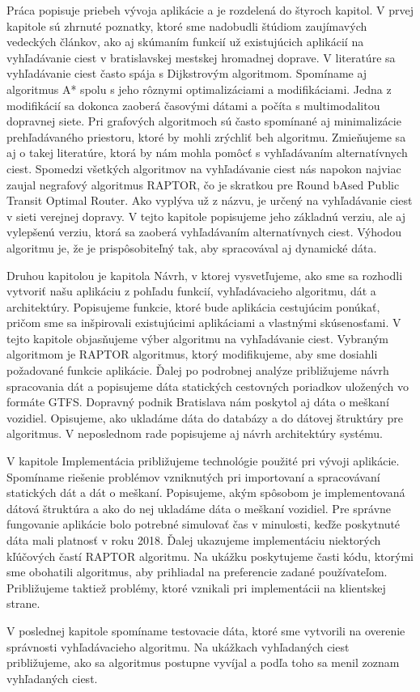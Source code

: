 Práca popisuje priebeh vývoja aplikácie a je rozdelená do štyroch kapitol. 
V prvej kapitole sú zhrnuté poznatky, ktoré sme nadobudli štúdiom zaujímavých vedeckých článkov, 
ako aj skúmaním funkcií už existujúcich aplikácií na vyhľadávanie ciest v bratislavskej mestskej hromadnej doprave. V literatúre sa vyhľadávanie ciest často spája s Dijkstrovým algoritmom.  
Spomíname aj algoritmus A* spolu s jeho rôznymi optimalizáciami a modifikáciami. Jedna z modifikácií sa dokonca zaoberá časovými dátami a počíta s multimodalitou dopravnej siete. Pri grafových algoritmoch sú často spomínané aj minimalizácie prehľadávaného priestoru, ktoré by mohli zrýchliť beh algoritmu. Zmieňujeme sa aj o takej literatúre, ktorá by nám mohla pomôcť s vyhľadávaním alternatívnych ciest. Spomedzi všetkých algoritmov na vyhľadávanie ciest nás napokon najviac zaujal negrafový algoritmus RAPTOR, čo je skratkou pre Round bAsed Public Transit Optimal Router. Ako vyplýva už z názvu, je určený na vyhľadávanie ciest v sieti verejnej dopravy. V tejto kapitole popisujeme jeho základnú verziu, ale aj vylepšenú verziu, ktorá sa zaoberá vyhľadávaním alternatívnych ciest. Výhodou algoritmu je, že je prispôsobiteľný tak, aby spracovával aj dynamické dáta. 

Druhou kapitolou je kapitola Návrh, v ktorej vysvetľujeme, ako sme sa rozhodli vytvoriť našu aplikáciu z pohľadu funkcií, vyhľadávacieho algoritmu, dát a architektúry. Popisujeme funkcie, ktoré bude aplikácia cestujúcim ponúkať, pričom sme sa inšpirovali existujúcimi aplikáciami a vlastnými skúsenosťami. V tejto kapitole objasňujeme výber algoritmu na vyhľadávanie ciest. Vybraným algoritmom je RAPTOR algoritmus, ktorý modifikujeme, aby sme dosiahli požadované funkcie aplikácie. Ďalej po podrobnej analýze približujeme návrh spracovania dát a popisujeme dáta statických cestovných poriadkov uložených vo formáte GTFS. Dopravný podnik Bratislava nám poskytol aj dáta o meškaní vozidiel. Opisujeme, ako ukladáme dáta do databázy a do dátovej štruktúry pre algoritmus. V neposlednom rade popisujeme aj návrh architektúry systému.

V kapitole Implementácia približujeme technológie použité pri vývoji aplikácie. Spomíname riešenie problémov vzniknutých pri importovaní a spracovávaní statických dát a dát o meškaní. Popisujeme, akým spôsobom je implementovaná dátová štruktúra a ako do nej ukladáme dáta o meškaní vozidiel. Pre správne fungovanie aplikácie bolo potrebné simulovať čas v minulosti, keďže poskytnuté dáta mali platnosť v roku 2018. Ďalej ukazujeme implementáciu niektorých kľúčových častí RAPTOR algoritmu. Na ukážku poskytujeme časti kódu, ktorými sme obohatili algoritmus, aby prihliadal na preferencie zadané používateľom. Približujeme taktiež problémy, ktoré vznikali pri implementácii na klientskej strane.

V poslednej kapitole spomíname testovacie dáta, ktoré sme vytvorili na overenie správnosti vyhľadávacieho algoritmu. Na ukážkach vyhľadaných ciest približujeme, ako sa algoritmus postupne vyvíjal a podľa toho sa menil zoznam vyhľadaných ciest. 

